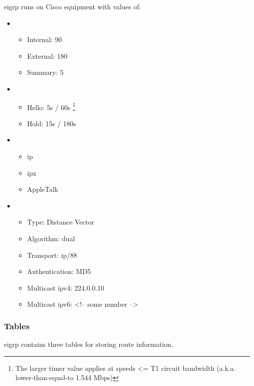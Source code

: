\gls{eigrp} runs on Cisco equipment with values of:
\begin{itemize}
    \item {}
    \begin{itemize}
        \item Internal: 90
        \item External: 180
        \item Summary: 5
    \end{itemize}
    \item {}
    \begin{itemize}
        \item Hello: 5s / 60s \footnote{The larger timer value applies at speeds <= T1 circuit bandwidth (a.k.a. lower-than-equal-to 1.544 Mbps)}
        \item Hold: 15s / 180s
    \end{itemize}
    \item {}
    \begin{itemize}
        \item \gls{ip}
        \item \gls{ipx}
        \item AppleTalk
    \end{itemize}
    \item {}
    \begin{itemize}
        \item Type: Distance Vector
        \item Algorithm: \gls{dual}
        \item Transport: \gls{ip}/88
        \item Authentication: MD5
        \item Multicast \gls{ipv4}: 224.0.0.10
        \item Multicast \gls{ipv6}: <!-- some number -->
    \end{itemize}
\end{itemize}

\subsubsection{Tables}

\gls{eigrp} contains three tables for storing route information.


